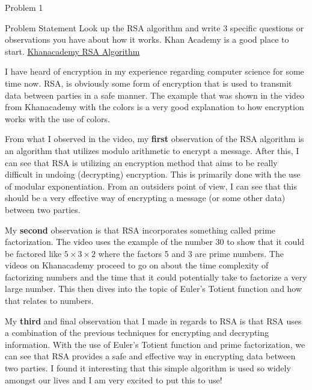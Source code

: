 \begin{problem}{Problem 1}
    \begin{statement}{Problem Statement}
        Look up the RSA algorithm and write 3 specific questions or observations you have about how it works. Khan Academy is a good place to start.
        \href{https://www.khanacademy.org/computing/computer-science/cryptography/modern-crypt/v/intro-to-rsa-encryption}{Khanacademy RSA Algorithm}
    \end{statement}

    \begin{Highlight}[Summary]
        I have heard of encryption in my experience regarding computer science for some time now. RSA, is obviously some form of encryption that is used to transmit data between parties in a safe manner.
        The example that was shown in the video from Khanacademy with the colors is a very good explanation to how encryption works with the use of colors. 

        From what I observed in the video, my \textbf{first} observation of the RSA algorithm is an algorithm that utilizes modulo arithmetic to encrypt a message. After this, I can see that RSA is 
        utilizing an encryption method that aims to be really difficult in undoing (decrypting) encryption. This is primarily done with the use of modular exponentiation. From an outsiders point of view, 
        I can see that this should be a very effective way of encrypting a message (or some other data) between two parties. 

        My \textbf{second} observation is that RSA incorporates something called prime factorization. The video uses the example of the number 30 to show that it could be factored like $5 \times 3 \times 2$ 
        where the factors 5 and 3 are prime numbers. The videos on Khanacademy proceed to go on about the time complexity of factorizing numbers and the time that it could potentially take to factorize a 
        very large number. This then dives into the topic of Euler's Totient function and how that relates to numbers.

        My \textbf{third} and final observation that I made in regards to RSA is that RSA uses a combination of the previous techniques for encrypting and decrypting information. With the use of Euler's 
        Totient function and prime factorization, we can see that RSA provides a safe and effective way in encrypting data between two parties. I found it interesting that this simple algorithm is used so 
        widely amongst our lives and I am very excited to put this to use!
    \end{Highlight}
\end{problem}

